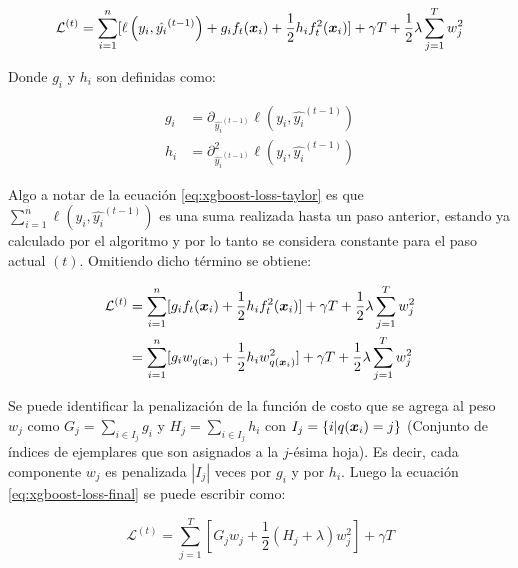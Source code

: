 \begin{equation} \label{eq:xgboost-loss-taylor}
    \mathcal{L}^{(t)} = \sum_{i = 1}^{n} [
        \ell\left(y_i,
                  \hat{y_{i}}^{(t-1)}
            \right) +
                g_i f_t(\boldsymbol{x}_i) +
                \frac{1}{2} h_i f_t^{2}(\boldsymbol{x}_i)
        ] + \gamma T + \frac{1}{2} \lambda \sum_{j=1}^{T} w_{j}^{2}
\end{equation}

Donde $g_i$ y $h_i$ son definidas como:

\begin{align}
    g_i &= \partial_{\hat{y_{i}}^{(t-1)}} \ell\left(y_i, \hat{y_{i}}^{(t-1)}\right) \\
    h_i &= \partial_{\hat{y_{i}}^{(t-1)}}^{2} \ell\left(y_i, \hat{y_{i}}^{(t-1)}\right)
\end{align}

Algo a notar de la ecuación \ref{eq:xgboost-loss-taylor} es que $\sum_{i =
1}^{n} \ell\left(y_i, \hat{y_{i}}^{(t-1)} \right)$ es una suma realizada hasta
un paso anterior, estando ya calculado por el algoritmo y por lo tanto se
considera constante para el paso actual $(t)$. Omitiendo dicho término se
obtiene:

\begin{align}
    \mathcal{L}^{(t)} &= \sum_{i = 1}^{n} [
        g_i f_t(\boldsymbol{x}_i) +
                \frac{1}{2} h_i f_t^{2}(\boldsymbol{x}_i)
        ] + \gamma T + \frac{1}{2} \lambda \sum_{j=1}^{T} w_{j}^{2} \\
                      &= \sum_{i = 1}^{n} [ \label{eq:xgboost-loss-final}
                        g_i w_{q(\boldsymbol{x}_i)} +
                                \frac{1}{2} h_i w_{q(\boldsymbol{x}_i)}^{2}
                        ] + \gamma T + \frac{1}{2} \lambda \sum_{j=1}^{T} w_{j}^{2}
\end{align}

Se puede identificar la penalización de la función de costo que se agrega al
peso $w_j$ como $G_{j} = \sum_{i \in I_j} g_i$ y $H_j = \sum_{i \in I_j} h_i$
con $I_j = \{i | q(\boldsymbol{x}_i) = j\}$ (Conjunto de índices de ejemplares que son
asignados a la $j$-ésima hoja). Es decir, cada componente $w_j$ es penalizada
$|I_{j}|$ veces por $g_i$ y por $h_i$. Luego la ecuación
\ref{eq:xgboost-loss-final} se puede escribir como:

\begin{equation}
    \mathcal{L}^{(t)} = \sum_{j = 1}^{T}[G_j w_j + \frac{1}{2} (H_j + \lambda)w_j^2] + \gamma T
\end{equation}

